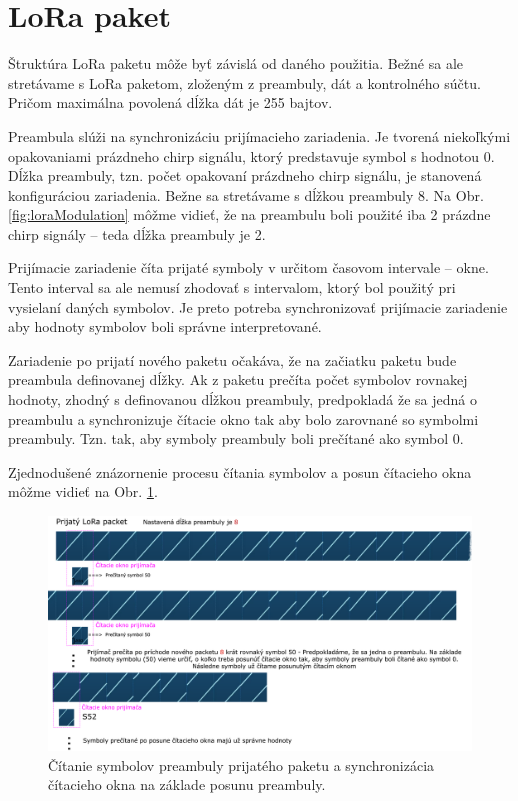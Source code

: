 \documentclass[slovak,master]{diploma}
\begin{document}
\section{LoRa paket}
Štruktúra LoRa paketu môže byť závislá od daného použitia. Bežné sa ale stretávame s LoRa paketom, zloženým z preambuly, dát a kontrolného súčtu. Pričom maximálna 
povolená dĺžka dát je 255 bajtov.

Preambula slúži na synchronizáciu prijímacieho zariadenia. Je tvorená niekoľkými opakovaniami prázdneho chirp signálu, ktorý predstavuje symbol s hodnotou 0. 
Dĺžka preambuly, tzn. počet opakovaní prázdneho chirp signálu, je stanovená konfiguráciou zariadenia. Bežne sa stretávame s dĺžkou preambuly 8.
Na Obr. \ref{fig:loraModulation} môžme vidieť, že na preambulu boli použité iba 2 prázdne chirp signály -- teda dĺžka preambuly je 2.

Prijímacie zariadenie číta prijaté symboly v určitom časovom intervale -- okne. Tento interval sa ale nemusí zhodovať s intervalom, ktorý bol použitý pri vysielaní daných symbolov.
Je preto potreba synchronizovať prijímacie zariadenie aby hodnoty symbolov boli správne interpretované.

Zariadenie po prijatí nového paketu očakáva, že na začiatku paketu bude preambula definovanej dĺžky. Ak z paketu prečíta počet symbolov rovnakej hodnoty, zhodný 
s definovanou dĺžkou preambuly, predpokladá že sa jedná o preambulu a synchronizuje čítacie okno tak aby bolo zarovnané so symbolmi preambuly. Tzn. tak, aby symboly preambuly boli 
prečítané ako symbol 0.

Zjednodušené znázornenie procesu čítania symbolov a posun čítacieho okna môžme vidieť na Obr. \ref{fig:loraPreamble1}.

\begin{figure}[h!]
	\centering
	\includegraphics[width=1\textwidth]{Figures/preambulaSmall.png}
	\caption{Čítanie symbolov preambuly prijatého paketu a synchronizácia čítacieho okna na základe posunu preambuly.}
	\label{fig:loraPreamble1}
\end{figure}
\end{document}
